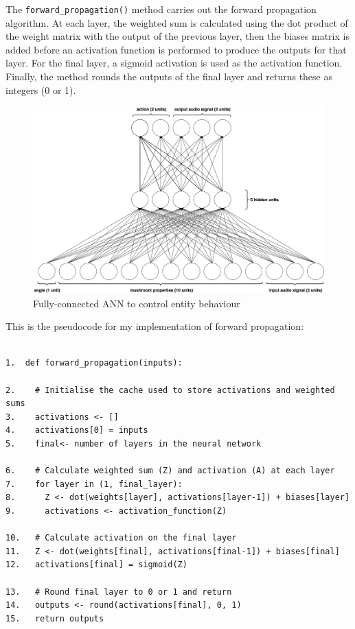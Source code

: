 \documentclass[12pt,a4paper,twoside,openright]{report}
\begin{document}
The \texttt{forward\_propagation()} method carries out the forward propagation algorithm. At each layer, the weighted sum is calculated using the dot product of the weight matrix with the output of the previous layer, then the biases matrix is added before an activation function is performed to produce the outputs for that layer. For the final layer, a sigmoid activation is used as the activation function. Finally, the method rounds the outputs of the final layer and returns these as integers (0 or 1).

\begin{figure}[h]
  \centering
  \includegraphics[width=.9\linewidth]{figs/fullneural}
  \caption{Fully-connected ANN to control entity behaviour}
  \label{fig:fullneural}
\end{figure}

\newpage 

This is the pseudocode for my implementation of forward propagation: 

\begin{verbatim}

1.  def forward_propagation(inputs):

2.    # Initialise the cache used to store activations and weighted sums
3.    activations <- []
4.    activations[0] = inputs
5.    final<- number of layers in the neural network

6.    # Calculate weighted sum (Z) and activation (A) at each layer
7.    for layer in (1, final_layer):
8.      Z <- dot(weights[layer], activations[layer-1]) + biases[layer]
9.      activations <- activation_function(Z)

10.   # Calculate activation on the final layer
11.   Z <- dot(weights[final], activations[final-1]) + biases[final]
12.   activations[final] = sigmoid(Z)

13.   # Round final layer to 0 or 1 and return
14.   outputs <- round(activations[final], 0, 1)
15.   return outputs

\end{verbatim}
\end{document}
